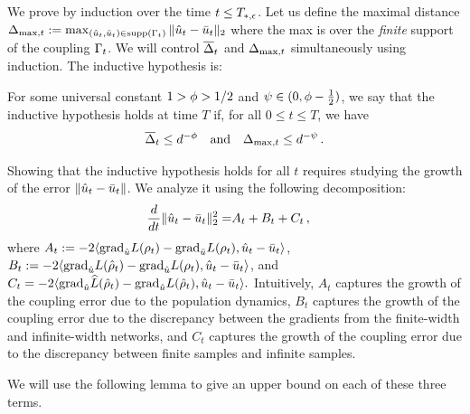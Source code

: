 We prove  by induction over the time $t \le T_{*, \epsilon}$.
Let us define the maximal distance
$\Delta_{\textup{max}, t} := \max_{(\hat{u}_t, \bar{u}_t) \in \textup{supp}(\Gamma_t)}\|\hat{u}_t - \bar{u}_t\|_2$ where the max is over the \textit{finite} support of the coupling $\Gamma_t$. 
We will control $\overline{\Delta}_t$ and $\Delta_{\textup{max}, t}$ simultaneously using induction. The inductive hypothesis is: 
\begin{assumption} \label{assumption:inductive_hypothesis}
	For some universal constant $1 > \phi > 1/2$ and $\psi \in (0, \phi-\frac{1}{2})$, we say that the inductive hypothesis holds at time $T$ if, for all $0\le t\leq T$, we have 
	\begin{align}
	\overline{\Delta}_t \leq d^{-\phi}~~ \textup{ and } ~~\Delta_{\textup{max}, t} \leq d^{-\psi} \,.
	\end{align}
\end{assumption}
Showing that the inductive hypothesis holds for all $t$ requires studying the growth of the error $\left\lVert\hat{u}_t - \bar{u}_t\right\rVert$. We analyze it using the following decomposition:~\footnotemark {}
\begin{align}
	\frac{d}{dt} \|\hat{u}_t-\bar{u}_t\|_2^2 =& A_t + B_t + C_t \,,
\end{align}
where $A_t := - 2 \langle {\textup{grad}}_{\hat{u}} L(\rho_t) - {\textup{grad}}_{\bar{u}} L(\rho_t), \hat{u}_t - \bar{u}_t \rangle$,
$B_t := -2 \langle {\textup{grad}}_{\hat{u}} L({\hat{\rho}}_t) - {\textup{grad}}_{\hat{u}} L(\rho_t), \hat{u}_t - \bar{u}_t \rangle$, and $C_t = -2 \langle {\textup{grad}}_{\hat{u}} \widehat{L}({\hat{\rho}}_t) - {\textup{grad}}_{\hat{u}} L({\hat{\rho}}_t), \hat{u}_t - \bar{u}_t \rangle.$ Intuitively, $A_t$ captures the growth of the coupling error due to the population dynamics, $B_t$ captures the growth of the coupling error due to the discrepancy between the gradients from the finite-width and infinite-width networks, and $C_t$ captures the growth of the coupling error due to the discrepancy between finite samples and infinite samples. 

We will use the following lemma to give an upper bound on each of these three terms.

